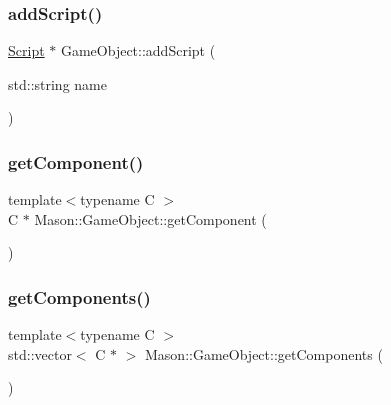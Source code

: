 \hypertarget{class_mason_1_1_game_object_aecc55ed7117f6f0b940ed05e4936496f}{}\label{class_mason_1_1_game_object_aecc55ed7117f6f0b940ed05e4936496f} 
\subsubsection{\texorpdfstring{add\+Script()}{addScript()}}
{\footnotesize\ttfamily \hyperlink{class_mason_1_1_script}{Script} $\ast$ Game\+Object\+::add\+Script (\begin{DoxyParamCaption}\item[{std\+::string}]{name }\end{DoxyParamCaption})}

\hypertarget{class_mason_1_1_game_object_aa5b74912ab3faf48cbc33db42ae9d0de}{}\label{class_mason_1_1_game_object_aa5b74912ab3faf48cbc33db42ae9d0de} 
\subsubsection{\texorpdfstring{get\+Component()}{getComponent()}}
{\footnotesize\ttfamily template$<$typename C $>$ \\
C $\ast$ Mason\+::\+Game\+Object\+::get\+Component (\begin{DoxyParamCaption}{ }\end{DoxyParamCaption})}

\hypertarget{class_mason_1_1_game_object_a0e8aabb17dd151cb5acb5d912b9316bf}{}\label{class_mason_1_1_game_object_a0e8aabb17dd151cb5acb5d912b9316bf} 
\subsubsection{\texorpdfstring{get\+Components()}{getComponents()}}
{\footnotesize\ttfamily template$<$typename C $>$ \\
std\+::vector$<$ C $\ast$ $>$ Mason\+::\+Game\+Object\+::get\+Components (\begin{DoxyParamCaption}{ }\end{DoxyParamCaption})}

